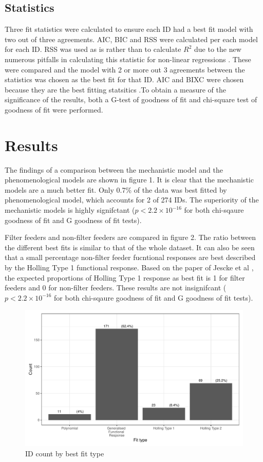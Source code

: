 \documentclass[11pt, a4paper, titlepage]{article}
\begin{document}
\subsection{Statistics}

Three fit statistics were calculated to ensure each ID had a best fit model with two out of three agreements. AIC, BIC and RSS were calculated per each model for each ID. RSS was used as is rather than to calculate $R^{2}$ due to the new numerous pitfalls in calculating this statistic for non-linear regressions \parencite{kvalseth1985}. These were compared and the model with 2 or more out 3 agreements between the statistics was chosen as the best fit for that ID. AIC and BIXC were chosen because they are the best fitting statsitics \parencite{Johnson2004}.To obtain a measure of the significance of the results, both a G-test of goodness of fit and chi-square test of goodness of fit were performed.

\section{Results}

The findings of a comparison between the mechanistic model and the phenomenological models are shown in figure 1. It is clear that the mechanistic models are a much better fit. Only 0.7\% of the data was best fitted by phenomenological model, which accounts for 2 of 274 IDs. The superiority of the mechanistic models is highly signifctant ($p < 2.2\times10^{-16}$ for both chi-sqaure goodness of fit and G goodness of fit tests). 

Filter feeders and non-filter feeders are compared in figure 2. The ratio between the different best fits is similar to that of the whole dataset. It can also be seen that a small percentage non-filter feeder fucntional responses are best described by the Holling Type 1 functional response. Based on the paper of Jescke et al \parencite{Jeschke2004}, the expected proportions of Holling Type 1 response as best fit is 1 for filter feeders and 0 for non-filter feeders. These results are not insignifcant ($p < 2.2\times10^{-16}$ for both chi-sqaure goodness of fit and G goodness of fit tests). 

\begin{figure}[ht!]
	\centering\includegraphics[width=1\textwidth]{../Results/Model_Comparison_Barchart.pdf}
	\caption{ID count by best fit type}
\end{figure}
\end{document}
